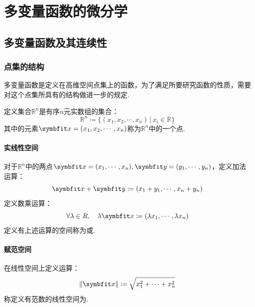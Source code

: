 \chapter{多变量函数的微分学}
\section{多变量函数及其连续性}


\subsection{点集的结构}
多变量函数是定义在高维空间点集上的函数，为了满足所要研究函数的性质，需要对这个点集所具有的结构做进一步的规定.

\begin{definition}
    定义集合$\mathbb{R}^n$是有序$n$元实数组的集合：
    \[\mathbb{R}^n \coloneq \{(x_1,x_2,\cdots,x_n)\,|\,x_i \in \mathbb{R}\}\]
    其中的元素$\vb{x} = (x_1,x_2,\cdots,x_n)$称为$\mathbb{R}^n$中的一个点.
\end{definition}

\subsubsection{实线性空间}
\begin{definition}
    对于$\mathbb{R}^n$中的两点$\vb{x}=(x_1,\cdots,x_n),\vb{y}=(y_1,\cdots,y_n)$，定义加法运算：
    \[\vb{x} + \vb{y} \coloneq (x_1+y_1,\cdots,x_n+y_n)\]
    定义数乘运算：
    \[\forall \lambda \in \mathbb{R},\quad \lambda\vb{x} \coloneq (\lambda x_1,\cdots,\lambda x_n)\]
    定义有上述运算的空间称为或.
\end{definition}


\subsubsection{赋范空间}
\begin{definition}
    在线性空间上定义运算：
    \[\left\|\vb{x}\right\| \coloneq \sqrt{x_1^2 + \cdots + x_n^2}\]
    称定义有范数的线性空间为\!.
\end{definition}


